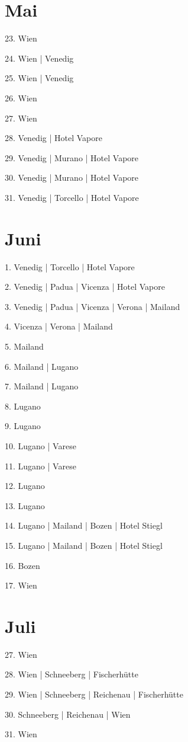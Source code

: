 \documentclass[twoside=false,titlepage=false,open=any, parskip=never, fontsize=10pt, headings=small, chapterprefix=false, appendixprefix=false, DIV=15]{scrbook}
\begin{document}
\begin{multicols}{3}
            \section*{Mai}
            23. Wien\par
            24. Wien | Venedig\par
            25. Wien | Venedig\par
            26. Wien\par
            27. Wien\par
            28. Venedig | Hotel Vapore\par
            29. Venedig | Murano | Hotel Vapore\par
            30. Venedig | Murano | Hotel Vapore\par
            31. Venedig | Torcello | Hotel Vapore\par
            \section*{Juni}
            1. Venedig | Torcello | Hotel Vapore\par
            2. Venedig | Padua | Vicenza | Hotel Vapore\par
            3. Venedig | Padua | Vicenza | Verona | Mailand\par
            4. Vicenza | Verona | Mailand\par
            5. Mailand\par
            6. Mailand | Lugano\par
            7. Mailand | Lugano\par
            8. Lugano\par
            9. Lugano\par
            10. Lugano | Varese\par
            11. Lugano | Varese\par
            12. Lugano\par
            13. Lugano\par
            14. Lugano | Mailand | Bozen | Hotel Stiegl\par
            15. Lugano | Mailand | Bozen | Hotel Stiegl\par
            16. Bozen\par
            17. Wien\par
            \section*{Juli}
            27. Wien\par
            28. Wien | Schneeberg | Fischerhütte\par
            29. Wien | Schneeberg | Reichenau | Fischerhütte\par
            30. Schneeberg | Reichenau | Wien\par
            31. Wien\par

\end{multicols}
\end{document}
